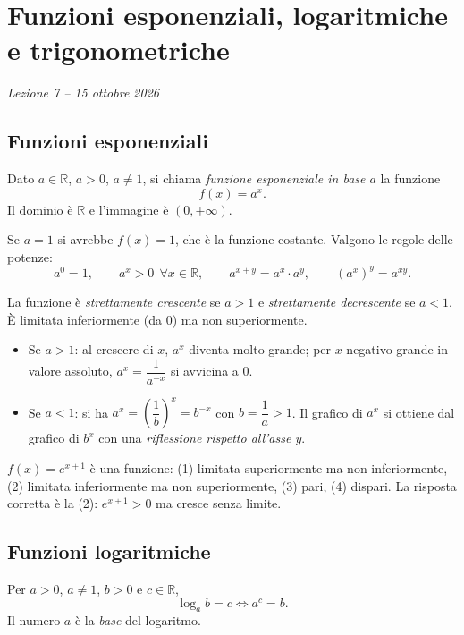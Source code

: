 \documentclass[11pt,a4paper]{article}
\begin{document}
\section[Funzioni esponenziali, logaritmiche e trigonometriche (Lezione 7 -- 15 ottobre 2026)]{Funzioni esponenziali, logaritmiche e trigonometriche}
\noindent\emph{Lezione 7 -- 15 ottobre 2026}
\subsection{Funzioni esponenziali}

\begin{definizione}
Dato $a \in \mathbb{R}$, $a > 0$, $a \ne 1$, si chiama \emph{funzione esponenziale in base $a$} la funzione
\[
f(x) = a^x .
\]
Il dominio è $\mathbb{R}$ e l'immagine è $(0, +\infty)$.
\end{definizione}

Se $a = 1$ si avrebbe $f(x) = 1$, che è la funzione costante. Valgono le regole delle potenze:
\[
a^0 = 1, \qquad a^x > 0 \ \ \forall x \in \mathbb{R}, \qquad a^{x+y} = a^x \cdot a^y, \qquad (a^x)^y = a^{xy}.
\]

La funzione è \emph{strettamente crescente} se $a > 1$ e \emph{strettamente decrescente} se $a < 1$. È limitata inferiormente (da $0$) ma non superiormente.
\begin{itemize}
    \item Se $a > 1$: al crescere di $x$, $a^x$ diventa molto grande; per $x$ negativo grande in valore assoluto, $a^x = \dfrac{1}{a^{-x}}$ si avvicina a $0$.
    \item Se $a < 1$: si ha $a^x = \left(\dfrac{1}{b}\right)^x = b^{-x}$ con $b = \dfrac{1}{a} > 1$. Il grafico di $a^x$ si ottiene dal grafico di $b^x$ con una \emph{riflessione rispetto all'asse $y$}.
\end{itemize}

\begin{esempio}[Test]
$f(x) = e^{x+1}$ è una funzione: (1) limitata superiormente ma non inferiormente, (2) limitata inferiormente ma non superiormente, (3) pari, (4) dispari. La risposta corretta è la (2): $e^{x+1} > 0$ ma cresce senza limite.
\end{esempio}

\subsection{Funzioni logaritmiche}

\begin{definizione}[Logaritmo]
Per $a > 0$, $a \ne 1$, $b > 0$ e $c \in \mathbb{R}$,
\[
\log_a b = c \iff a^c = b .
\]
Il numero $a$ è la \emph{base} del logaritmo.
\end{definizione}
\end{document}
